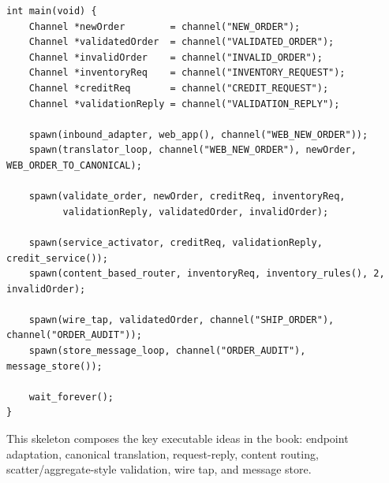 \documentclass[11pt]{article}
\begin{document}
\begin{verbatim}
int main(void) {
    Channel *newOrder        = channel("NEW_ORDER");
    Channel *validatedOrder  = channel("VALIDATED_ORDER");
    Channel *invalidOrder    = channel("INVALID_ORDER");
    Channel *inventoryReq    = channel("INVENTORY_REQUEST");
    Channel *creditReq       = channel("CREDIT_REQUEST");
    Channel *validationReply = channel("VALIDATION_REPLY");

    spawn(inbound_adapter, web_app(), channel("WEB_NEW_ORDER"));
    spawn(translator_loop, channel("WEB_NEW_ORDER"), newOrder, WEB_ORDER_TO_CANONICAL);

    spawn(validate_order, newOrder, creditReq, inventoryReq,
          validationReply, validatedOrder, invalidOrder);

    spawn(service_activator, creditReq, validationReply, credit_service());
    spawn(content_based_router, inventoryReq, inventory_rules(), 2, invalidOrder);

    spawn(wire_tap, validatedOrder, channel("SHIP_ORDER"), channel("ORDER_AUDIT"));
    spawn(store_message_loop, channel("ORDER_AUDIT"), message_store());

    wait_forever();
}
\end{verbatim}

This skeleton composes the key executable ideas in the book: endpoint
adaptation, canonical translation, request-reply, content routing,
scatter/aggregate-style validation, wire tap, and message store.
\end{document}
